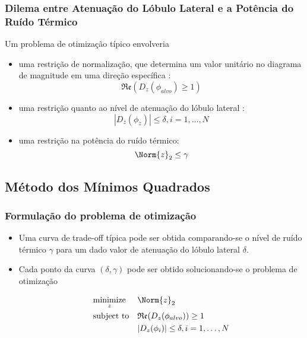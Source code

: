 \begin{frame}
\frametitle{Dilema entre Atenuação do Lóbulo Lateral e a Pot\^encia do Ru\'ido Térmico}

Um problema de otimização t\'ipico envolveria

\begin{itemize}
\item uma restrição de normalização, que determina um valor unitário no diagrama de magnitude em uma direção espec\'ifica :
\begin{equation}
\mathfrak{Re} \left( D_{z}\left( \phi_{alvo}\right) \geq 1 \right)
\end{equation}
\item uma restrição quanto ao n\'ivel de atenuação do lóbulo lateral :
\begin{equation}
|D_{z} \left( \phi_{z} \right) | \leq \delta, i = 1, \ldots, N
\end{equation}
\item uma restrição na pot\^encia do ru\'ido térmico:
\begin{equation}
\Norm{z}_{2} \leq \gamma
\end{equation}
\end{itemize}
\end{frame}


\subsection{Método dos M\'inimos Quadrados}

\begin{frame}

\frametitle{Formulação do problema de otimização}

\begin{itemize}

\item Uma curva de trade-off t\'ipica pode ser obtida comparando-se o n\'ivel de ru\'ido térmico $\gamma$ para um dado valor de atenuação do lóbulo lateral $\delta$.

\item Cada ponto da curva $\left( \delta, \gamma \right)$ pode ser obtido solucionando-se o problema de otimização

\begin{equation*}
\begin{aligned}
& \underset{z}{\text{minimize}}
&& \Norm{z}_{2} \\
& \text{subject to}
&& \mathfrak{Re}(D_{z}(\phi_{alvo})) \geq 1 \\
&
&& |D_{z}(\phi_{i})| \leq \delta, i = 1, \ldots, N
\end{aligned}
\end{equation*}

\end{itemize}

\end{frame}


